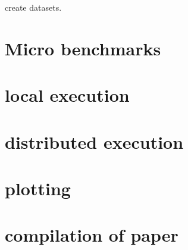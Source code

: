 \documentclass{readme}
\begin{document}
create datasets.

\section{Micro benchmarks}



\section{local execution}

\section{distributed execution}

\section{plotting}

\section{compilation of paper}
\end{document}

